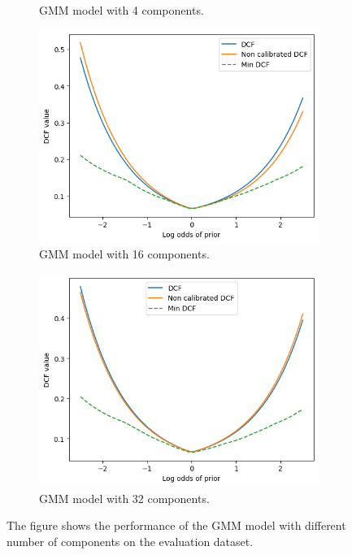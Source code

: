 \documentclass{article}
\begin{document}
\begin{figure}[ht]
\begin{subfigure}[b]{0.45\textwidth}
        \caption{GMM model with 4 components.}
    \end{subfigure}
    \vfill
    \begin{subfigure}[b]{0.45\textwidth}
        \centering
        \includegraphics[width=\textwidth]{images/evaluation_gmm_16.png}
        \caption{GMM model with 16 components.}
    \end{subfigure}
    \hfill
    \begin{subfigure}[b]{0.45\textwidth}
        \centering
        \includegraphics[width=\textwidth]{images/evaluation_gmm_32.png}
        \caption{GMM model with 32 components.}
    \end{subfigure}
    \caption{The figure shows the performance of the GMM model with different number of components on the evaluation dataset.}
    \label{fig:evaluation_gmm}
\end{figure}
\end{document}
